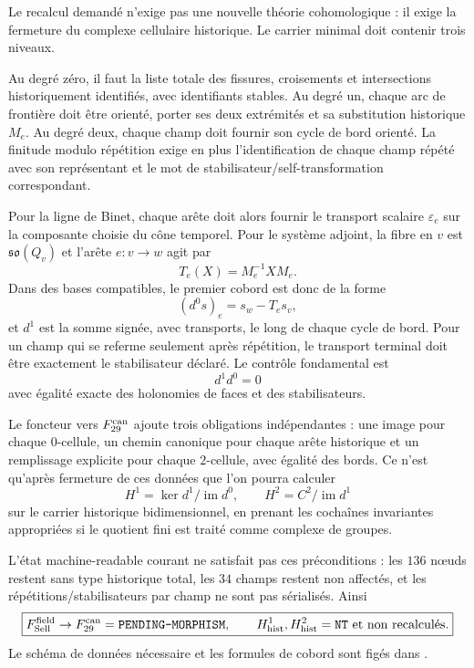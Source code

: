 \documentclass[11pt,a4paper]{article}
\newcommand{\certPending}{\texttt{PENDING-MORPHISM}}
\newcommand{\certNT}{\texttt{NT}}
\begin{document}
Le recalcul demandé n'exige pas une nouvelle théorie cohomologique : il exige la fermeture du complexe cellulaire historique. Le carrier minimal doit contenir trois niveaux.

Au degré zéro, il faut la liste totale des fissures, croisements et intersections historiquement identifiés, avec identifiants stables. Au degré un, chaque arc de frontière doit être orienté, porter ses deux extrémités et sa substitution historique $M_e$. Au degré deux, chaque champ doit fournir son cycle de bord orienté. La finitude modulo répétition exige en plus l'identification de chaque champ répété avec son représentant et le mot de stabilisateur/self-transformation correspondant.

Pour la ligne de Binet, chaque arête doit alors fournir le transport scalaire $\varepsilon_e$ sur la composante choisie du cône temporel. Pour le système adjoint, la fibre en $v$ est $\mathfrak{so}(Q_v)$ et l'arête $e:v\to w$ agit par
\[
 T_e(X)=M_e^{-1}XM_e.
\]
Dans des bases compatibles, le premier cobord est donc de la forme
\begin{equation}\label{eq:v44-d0}
 (d^0s)_e=s_w-T_e s_v,
\end{equation}
et $d^1$ est la somme signée, avec transports, le long de chaque cycle de bord. Pour un champ qui se referme seulement après répétition, le transport terminal doit être exactement le stabilisateur déclaré. Le contrôle fondamental est
\[
 \boxed{d^1d^0=0}
\]
avec égalité exacte des holonomies de faces et des stabilisateurs.

Le foncteur vers $F_{29}^{\rm can}$ ajoute trois obligations indépendantes : une image pour chaque $0$-cellule, un chemin canonique pour chaque arête historique et un remplissage explicite pour chaque $2$-cellule, avec égalité des bords. Ce n'est qu'après fermeture de ces données que l'on pourra calculer
\[
 H^1=\ker d^1/\operatorname{im}d^0,
 \qquad
 H^2=C^2/\operatorname{im}d^1
\]
sur le carrier historique bidimensionnel, en prenant les cochaînes invariantes appropriées si le quotient fini est traité comme complexe de groupes.

L'état machine-readable courant ne satisfait pas ces préconditions : les $136$ nœuds restent sans type historique total, les $34$ champs restent non affectés, et les répétitions/stabilisateurs par champ ne sont pas sérialisés. Ainsi
\[
 \boxed{
 F_{\rm Sell}^{\rm field}\to F_{29}^{\rm can}=\certPending,
 \qquad
 H^1_{\rm hist},H^2_{\rm hist}=\certNT\text{ et non recalculés}.}
\]
Le schéma de données nécessaire et les formules de cobord sont figés dans .
\end{document}
